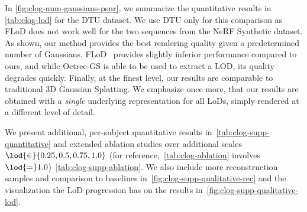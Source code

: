     In \cref{fig:clog-num-gaussians-psnr}, we summarize the quantitative results
    in \cref{tab:clog-lod} for the DTU dataset.
    We use DTU only for this comparison as FLoD does not work well for the two
    sequences from the NeRF Synthetic dataset.
    As shown, our method provides the best rendering quality given a predetermined
    number of Gaussians.
    FLoD~\cite{seo2024flod} provides slightly inferior performance compared to
    ours, and while Octree-GS is able to be used to extract a LOD, its quality
    degrades quickly.
    Finally, at the finest level, our results are comparable to traditional 3D
    Gaussian Splatting.
    We emphasize once more, that our results are obtained with a \emph{single}
    underlying representation for all LoDs, simply rendered at a different level
    of detail.

    We present additional, per-subject quantitative results
    in~\cref{tab:clog-supp-quantitative} and extended ablation studies over
    additional scales $\lod{\in}\{0.25, 0.5, 0.75, 1.0\}$ (for
    reference,~\cref{tab:clog-ablation} involves
    $\lod{=}1.0$)~\cref{tab:clog-supp-ablation}.
    We also include more reconstruction samples and comparison to baselines
    in~\cref{fig:clog-supp-qualitative-rec} and the visualization the LoD
    progression has on the results in~\cref{fig:clog-supp-qualitative-lod}.



